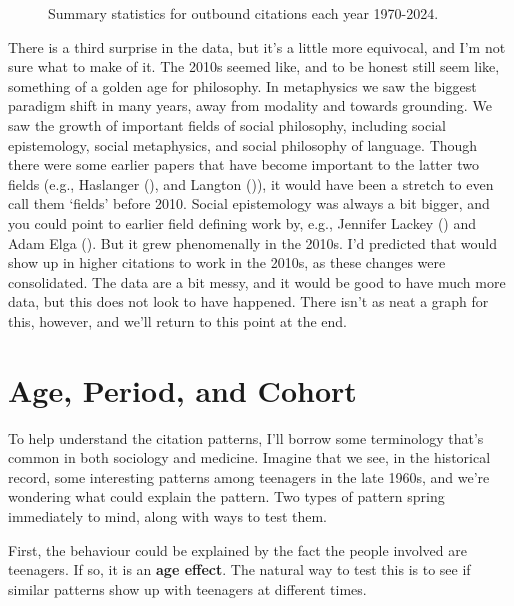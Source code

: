 \documentclass[
  12pt,
  letterpaper,
  DIV=11,
  numbers=noendperiod]{scrartcl}
\begin{document}
\begin{figure}
\begin{minipage}{\linewidth}
{}


\end{minipage}%

\caption{\label{fig-overall-median-mode}Summary statistics for outbound
citations each year 1970-2024.}

\end{figure}%

There is a third surprise in the data, but it's a little more equivocal,
and I'm not sure what to make of it. The 2010s seemed like, and to be
honest still seem like, something of a golden age for philosophy. In
metaphysics we saw the biggest paradigm shift in many years, away from
modality and towards grounding. We saw the growth of important fields of
social philosophy, including social epistemology, social metaphysics,
and social philosophy of language. Though there were some earlier papers
that have become important to the latter two fields (e.g., Haslanger
(), and Langton
()), it would have been a stretch to
even call them `fields' before 2010. Social epistemology was always a
bit bigger, and you could point to earlier field defining work by, e.g.,
Jennifer Lackey () and Adam Elga
(). But it grew phenomenally in the 2010s.
I'd predicted that would show up in higher citations to work in the
2010s, as these changes were consolidated. The data are a bit messy, and
it would be good to have much more data, but this does not look to have
happened. There isn't as neat a graph for this, however, and we'll
return to this point at the end.

\section{Age, Period, and Cohort}\label{sec-apc-described}

To help understand the citation patterns, I'll borrow some terminology
that's common in both sociology and medicine. Imagine that we see, in
the historical record, some interesting patterns among teenagers in the
late 1960s, and we're wondering what could explain the pattern. Two
types of pattern spring immediately to mind, along with ways to test
them.

First, the behaviour could be explained by the fact the people involved
are teenagers. If so, it is an \textbf{age effect}. The natural way to
test this is to see if similar patterns show up with teenagers at
different times.
\end{document}
